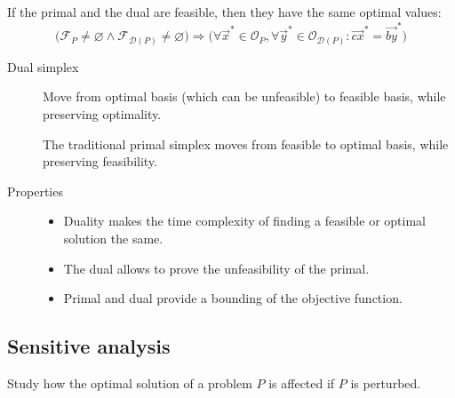 \begin{theorem} 
    If the primal and the dual are feasible, then they have the same optimal values:
    \[ 
        \Big( \mathcal{F}_{P} \neq \varnothing \land \mathcal{F}_{\mathcal{D}(P)} \neq \varnothing \Big) \Rightarrow 
        \Big( \forall \vec{x}^* \in \mathcal{O}_P, \forall \vec{y}^* \in \mathcal{O}_{\mathcal{D}(P)}: \vec{cx}^* = \vec{by}^* \Big)
    \]
\end{theorem}

\begin{description}
    \item[Dual simplex] 
        Move from optimal basis (which can be unfeasible) to feasible basis, while preserving optimality.

        \begin{remark}
            The traditional primal simplex moves from feasible to optimal basis, while preserving feasibility.
        \end{remark}

    \item[Properties]
        \phantom{}
        \begin{itemize}
            \item Duality makes the time complexity of finding a feasible or optimal solution the same.
            \item The dual allows to prove the unfeasibility of the primal.
            \item Primal and dual provide a bounding of the objective function.
        \end{itemize}
\end{description}


\subsection{Sensitive analysis}

Study how the optimal solution of a problem $P$ is affected if $P$ is perturbed.

